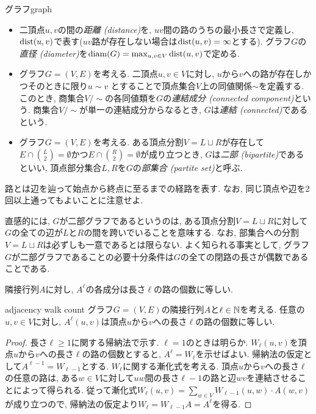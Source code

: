 \begin{definition}{グラフ}{graph}
\begin{itemize}
    \item 二頂点$u,v$の間の\emph{距離 (distance)}を, $uv$間の路のうちの最小長さで定義し, $\mathrm{dist}(u,v)$で表す($uv$路が存在しない場合は$\mathrm{dist}(u,v)=\infty$とする). グラフ$G$の\emph{直径 (diameter)}を$\mathrm{diam}(G)=\max_{u,v\in V}\mathrm{dist}(u,v)$で定める.
    \item グラフ$G=(V,E)$を考える.
          二頂点$u,v \in V$に対し,
          $u$から$v$への路が存在しかつそのときに限り$u\sim v$
          とすることで頂点集合$V$上の同値関係$\sim$を定義する.
          このとき, 商集合$V / \sim$の各同値類を$G$の\emph{連結成分 (connected component)}という.
          商集合$V / \sim$が単一の連結成分からなるとき, $G$は\emph{連結 (connected)}であるという.
    \item   グラフ$G=(V,E)$を考える.
          ある頂点分割$V=L\sqcup R$が存在して$E\cap \binom{L}{2}=\emptyset$かつ$E\cap \binom{R}{2}=\emptyset$が成り立つとき, $G$は\emph{二部 (bipartite)}であるといい,
          頂点部分集合$L,R$を$G$の\emph{部集合 (partite set)}と呼ぶ.
  \end{itemize}
\end{definition}
路とは辺を辿って始点から終点に至るまでの経路を表す.
なお, 同じ頂点や辺を2回以上通ってもよいことに注意せよ.

直感的には, $G$が二部グラフであるというのは, ある頂点分割$V=L\sqcup R$に対して
$G$の全ての辺が$L$と$R$の間を跨いでいることを意味する.
なお, 部集合への分割$V = L\sqcup R$は必ずしも一意であるとは限らない.
よく知られる事実として, グラフ$G$が二部グラフであることの必要十分条件は$G$の全ての閉路の長さが偶数であることである.

隣接行列$A$に対し, $A^\ell$の各成分は長さ$\ell$の路の個数に等しい.
\begin{lemma}{}{adjacency walk count}
  グラフ$G=(V,E)$の隣接行列$A$と$\ell\in\mathbb{N}$を考える.
  任意の$u,v\in V$に対し, $A^\ell(u,v)$は頂点$u$から$v$への長さ$\ell$の路の個数に等しい.
\end{lemma}
\begin{proof}
  長さ$\ell\ge 1$に関する帰納法で示す. $\ell=1$のときは明らか.
  $W_\ell(u,v)$を頂点$u$から$v$への長さ$\ell$の路の個数とすると, $A^\ell = W_\ell$を示せばよい.
  帰納法の仮定として$A^{\ell - 1} = W_{\ell - 1}$とする.
  $W_{\ell}$に関する漸化式を考える.
  頂点$u$から$v$への長さ$\ell$の任意の路は,
  ある$w\in V$に対して$uw$間の長さ$\ell-1$の路と辺$wv$を連結させることによって得られる.
  従って漸化式$W_\ell(u,v) = \sum_{w \in V} W_{\ell-1}(u,w) \cdot A(w,v)$が成り立つので, 帰納法の仮定より$W_\ell = W_{\ell-1}A = A^\ell$を得る.
\end{proof}

